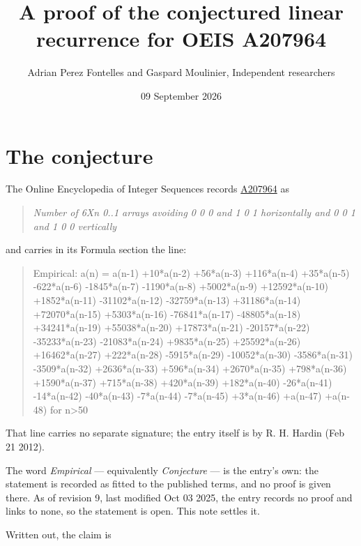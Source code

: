 \documentclass[11pt]{article}
\title{A proof of the conjectured linear recurrence for OEIS A207964}
\author{Adrian Perez Fontelles and Gaspard Moulinier, Independent researchers}
\date{09 September 2026}
\theoremstyle{definition}
\begin{document}
\maketitle
\section{The conjecture}

The Online Encyclopedia of Integer Sequences records \href{https://oeis.org/A207964}{A207964} as

\begin{quote}\itshape Number of 6Xn 0..1 arrays avoiding 0 0 0 and 1 0 1 horizontally and 0 0 1 and 1 0 0 vertically\end{quote}

and carries in its Formula section the line:

\begin{quote}\ttfamily Empirical: a(n) = a(n-1) +10*a(n-2) +56*a(n-3) +116*a(n-4) +35*a(n-5) -622*a(n-6) -1845*a(n-7) -1190*a(n-8) +5002*a(n-9) +12592*a(n-10) +1852*a(n-11) -31102*a(n-12) -32759*a(n-13) +31186*a(n-14) +72070*a(n-15) +5303*a(n-16) -76841*a(n-17) -48805*a(n-18) +34241*a(n-19) +55038*a(n-20) +17873*a(n-21) -20157*a(n-22) -35233*a(n-23) -21083*a(n-24) +9835*a(n-25) +25592*a(n-26) +16462*a(n-27) +222*a(n-28) -5915*a(n-29) -10052*a(n-30) -3586*a(n-31) -3509*a(n-32) +2636*a(n-33) +596*a(n-34) +2670*a(n-35) +798*a(n-36) +1590*a(n-37) +715*a(n-38) +420*a(n-39) +182*a(n-40) -26*a(n-41) -14*a(n-42) -40*a(n-43) -7*a(n-44) -7*a(n-45) +3*a(n-46) +a(n-47) +a(n-48) for n>50\end{quote}

That line carries no separate signature; the entry itself is by R. H. Hardin (Feb 21 2012).

The word {\itshape Empirical} --- equivalently {\itshape Conjecture} --- is the entry's own: the statement is recorded as fitted to the published terms, and no proof is given there. As of revision 9, last modified Oct 03 2025, the entry records no proof and links to none, so the statement is open. This note settles it.

Written out, the claim is
\end{document}
